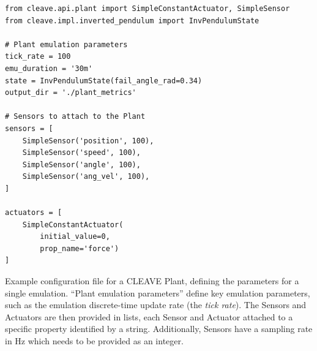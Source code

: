 \begin{listing}
    \begin{verbatim}
from cleave.api.plant import SimpleConstantActuator, SimpleSensor
from cleave.impl.inverted_pendulum import InvPendulumState

# Plant emulation parameters
tick_rate = 100
emu_duration = '30m'
state = InvPendulumState(fail_angle_rad=0.34)
output_dir = './plant_metrics'

# Sensors to attach to the Plant
sensors = [
    SimpleSensor('position', 100),
    SimpleSensor('speed', 100),
    SimpleSensor('angle', 100),
    SimpleSensor('ang_vel', 100),
]

actuators = [
    SimpleConstantActuator(
        initial_value=0,
        prop_name='force')
]
    \end{verbatim}
    \caption{
        Example configuration file for a \ac{CLEAVE} Plant, defining the parameters for a single emulation.
        ``Plant emulation parameters'' define key emulation parameters, such as the emulation discrete-time update rate (the \emph{tick rate}).
        The Sensors and Actuators are then provided in lists, each Sensor and Actuator attached to a specific property identified by a string.
        Additionally, Sensors have a sampling rate in Hz which needs to be provided as an integer.
    }
    \label{lst:config:plant}
\end{listing}